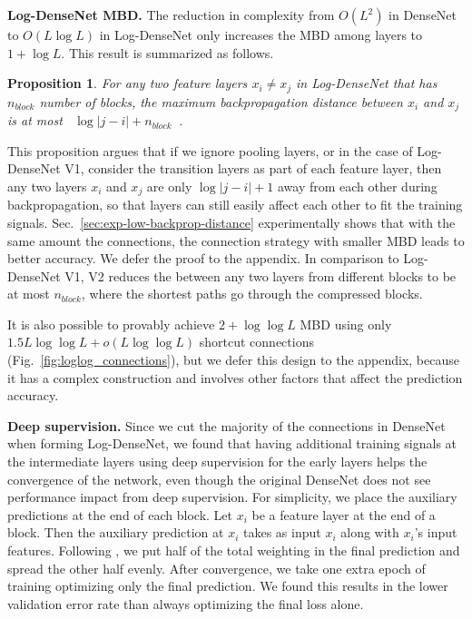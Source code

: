 \documentclass{article}
\newtheorem{proposition}[theorem]{Proposition}
\newcommand{\logdense}{Log-DenseNet\xspace}
\newcommand{\pbdfull}{maximum backpropagation distance\xspace}
\newcommand{\pbd}{MBD\xspace}
\newcommand{\bd}{\text{BD}\xspace}
\begin{document}
\textbf{\logdense \pbd.} 
The reduction in complexity from $O(L^2)$ in DenseNet to $O(L\log L)$ in \logdense only increases the \pbd among layers to $1+\log L$. This result is summarized as follows.

\begin{proposition}
\label{them:log-dense-log-dist}
For any two feature layers $x_i \neq x_j$ in \logdense that has $n_{block}$ number of blocks, the \pbdfull between $x_i$ and $x_j$ is at most \mbox{ $ \log |j-i| + n_{block}$ }.
\end{proposition}

This proposition argues that if we ignore pooling layers, or in the case of \logdense V1, consider the transition layers as part of each feature layer, then any two layers $x_i$ and $x_j$ are only $\log |j-i| +1$ away from each other during backpropagation, so that layers can still easily affect each other to fit the training signals. 
Sec.~\ref{sec:exp-low-backprop-distance} experimentally shows that with the same amount the connections, the connection strategy with smaller \pbd leads to better accuracy. We defer the proof to the appendix. In comparison to \logdense V1, V2 reduces the \bd between any two layers from different blocks to be at most $n_{block}$, where the shortest paths go through the  compressed blocks.

It is also possible to provably achieve $2+\log \log L$ \pbd using only $1.5L\log\log L + o(L\log\log L)$ shortcut connections (Fig.~\ref{fig:loglog_connections}), but we defer this design to the appendix, because it has a complex construction and involves other factors that affect the prediction accuracy.


\textbf{Deep supervision.}
Since we cut the majority of the connections in DenseNet when forming \logdense, we found that having additional training signals at the intermediate layers using deep supervision \citep{supervisednet}  for the early layers helps the convergence of the network, even though the original DenseNet does not see performance impact from deep supervision. For simplicity, we place the auxiliary predictions at the end of each block. Let $x_i$ be a feature layer at the end of a block. Then the auxiliary prediction at $x_i$ takes as input $x_i$ along with $x_i$'s input features. Following \citep{hu:ann}, we put half of the total weighting in the final prediction and spread the other half evenly. After convergence, we take one extra epoch of training optimizing only the final prediction. We found this results in the lower validation error rate than always optimizing the final loss alone.
\end{document}

